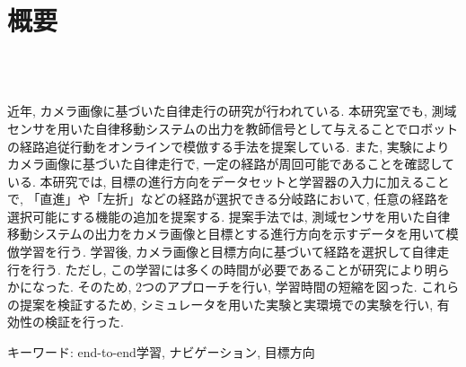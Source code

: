 \chapter*{概要}
\thispagestyle{empty}
%
\begin{center}
  \scalebox{1.5}{視覚と行動のend-to-end学習により}\\
  \scalebox{1.5}{経路追従行動をオンラインで模倣する手法の提案}\\
  \scalebox{1.5}{（目標方向による経路選択機能の追加と検証）}
\end{center}
\vspace{1.0zh}
%
\par
近年, カメラ画像に基づいた自律走行の研究が行われている. 本研究室でも, 測域センサを用いた自律移動システムの出力を教師信号として与えることでロボットの経路追従行動をオンラインで模倣する手法を提案している. また, 実験によりカメラ画像に基づいた自律走行で, 一定の経路が周回可能であることを確認している. 本研究では, 目標の進行方向をデータセットと学習器の入力に加えることで, 「直進」や「左折」などの経路が選択できる分岐路において, 任意の経路を選択可能にする機能の追加を提案する. 提案手法では, 測域センサを用いた自律移動システムの出力をカメラ画像と目標とする進行方向を示すデータを用いて模倣学習を行う. 学習後, カメラ画像と目標方向に基づいて経路を選択して自律走行を行う. 
ただし, この学習には多くの時間が必要であることが研究により明らかになった. そのため, 2つのアプローチを行い, 学習時間の短縮を図った. 
これらの提案を検証するため, シミュレータを用いた実験と実環境での実験を行い, 有効性の検証を行った. 
\vspace{12pt}
\par キーワード: end-to-end学習, ナビゲーション, 目標方向
%
\newpage
